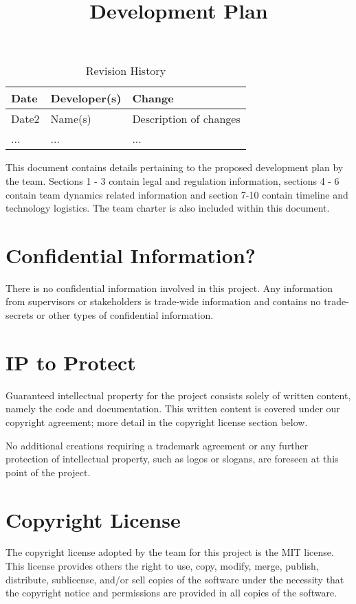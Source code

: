 \documentclass{article}
\title{Development Plan\\\progname}
\author{\authname}
\date{}
\begin{document}
\maketitle

\begin{table}[hp]
\caption{Revision History} \label{TblRevisionHistory}
\begin{tabularx}{\textwidth}{llX}
\toprule
\textbf{Date} & \textbf{Developer(s)} & \textbf{Change}\\
\midrule
Date2 & Name(s) & Description of changes\\
... & ... & ...\\
\bottomrule
\end{tabularx}
\end{table}

\newpage{}


This document contains details pertaining to the proposed development plan by the team.
Sections 1 - 3 contain legal and regulation information, sections 4 - 6 contain team dynamics related information and 
section 7-10 contain timeline and technology logistics. The team charter is also included within this document. \\


\section{Confidential Information?}
There is no confidential information involved in this project. Any information
from supervisors or stakeholders is trade-wide information and contains
no trade-secrets or other types of confidential information.

\section{IP to Protect}
Guaranteed intellectual property for the project consists solely of written
content, namely the code and documentation. This written content is covered
under our copyright agreement; more detail in the copyright license section
below.

No additional creations requiring a trademark agreement or any further
protection of intellectual property, such as logos or slogans, are foreseen
at this point of the project. 



\section{Copyright License}
The copyright license adopted by the team for this project is the MIT license.
This license provides others the right to use, copy, modify, merge, publish,
distribute, sublicense, and/or sell copies of the software under the necessity
that the copyright notice and permissions are provided in all copies of the software.
\end{document}
